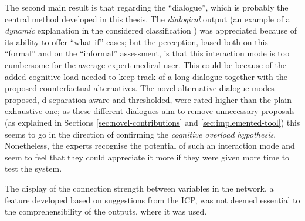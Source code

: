 The second main result is that regarding the \enquote{dialogue}, which is probably the central method developed in this thesis.
The \textit{dialogical} output (an example of a \textit{dynamic} explanation in the considered classification \citep{lacave2002review}) was appreciated because of its ability to offer \enquote{what-if} cases; but the perception, based both on this \enquote{formal} and on the \enquote{informal} assessment, is that this interaction mode is too cumbersome for the average expert medical user.
This could be because of the added cognitive load needed to keep track of a long dialogue together with the proposed counterfactual alternatives.
The novel alternative dialogue modes proposed, d-separation-aware and thresholded, were rated higher than the plain exhaustive one; as these different dialogues aim to remove unnecessary proposals (as explained in Sections \ref{sec:novel-contributions} and \ref{sec:implemented-tool}) this seems to go in the direction of confirming the \textit{cognitive overload hypothesis}.
Nonetheless, the experts recognise the potential of such an interaction mode and seem to feel that they could appreciate it more if they were given more time to test the system.

The display of the connection strength between variables in the network, a feature developed based on suggestions from the ICP, was not deemed essential to the comprehensibility of the outputs, where it was used.


